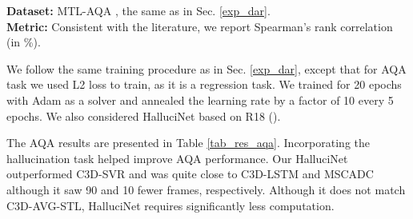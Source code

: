 \documentclass[10pt,twocolumn,letterpaper]{article}
\begin{document}
\noindent\textbf{Dataset:} MTL-AQA \cite{mtlaqa}, the same as in Sec. \ref{exp_dar}.\\

\noindent\textbf{Metric:} Consistent with the literature, we report Spearman's rank correlation (in \%). 

We follow the same training procedure as in Sec. \ref{exp_dar}, except that for AQA task we used L2 loss to train, as it is a regression task. We trained for 20 epochs with Adam as a solver and annealed the learning rate by a factor of 10 every 5 epochs. We also considered HalluciNet based on R18 ().

The AQA results are presented in Table \ref{tab_res_aqa}. Incorporating the hallucination task helped improve AQA performance. Our HalluciNet outperformed C3D-SVR and was quite close to C3D-LSTM and MSCADC although it saw 90 and 10 fewer frames, respectively.  Although it does not match C3D-AVG-STL, HalluciNet requires significantly less computation.
\end{document}
